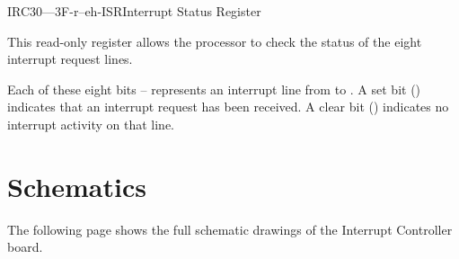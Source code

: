 \begin{ioport}{IRC}{30—3F}{-r--eh-}{ISR}{Interrupt Status Register}

  This read-only register allows the processor to check the status of the eight
  interrupt request lines.

  \begin{cbitfield}
  \end{cbitfield}

  Each of these eight bits – represents an interrupt
  line from  to . A set bit () indicates that an
  interrupt request has been received. A clear bit () indicates no
  interrupt activity on that line.

\end{ioport}

\section{Schematics}

The following page shows the full schematic drawings of the Interrupt Controller board.

\cleardoublepage
{}

